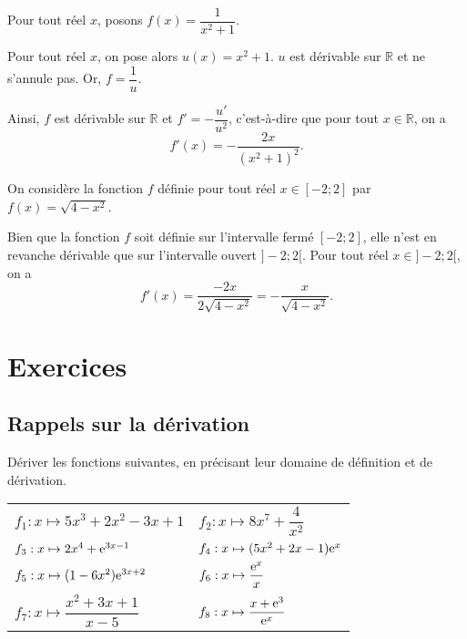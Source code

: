 \documentclass[11pt,fleqn, openany]{book} %
\begin{document}
\begin{example}Pour tout réel $x$, posons $f(x)=\dfrac{1}{x^2+1}$. 

Pour tout réel $x$, on pose alors $u(x)=x^2+1$. $u$ est dérivable sur $\mathbb{R}$ et ne s'annule pas. Or, $f=\dfrac{1}{u}$.

 Ainsi, $f$ est dérivable sur $\mathbb{R}$ et $f'=-\dfrac{u'}{u^2}$, c'est-à-dire que pour tout $x\in \mathbb{R}$, on a
\[ f'(x)=- \dfrac{2x}{(x^2+1)^2}.\]\end{example}

\begin{example}On considère la fonction $f$ définie pour tout réel $x\in[-2;2]$ par $f(x)=\sqrt{4-x^2}$.

Bien que la fonction $f$ soit définie sur l'intervalle fermé $[-2;2]$, elle n'est en revanche dérivable que sur l'intervalle ouvert $]-2;2[$. Pour tout réel $x\in]-2;2[$, on a
\[f'(x)=\dfrac{-2x}{2\sqrt{4-x^2}}=-\dfrac{x}{\sqrt{4-x^2}}.\]\end{example}

\chapter{Exercices}
\setcounter{section}{0}
\section*{Rappels sur la dérivation}

\begin{exercise}[topic=der01]Dériver les fonctions suivantes, en précisant leur domaine de définition et de dérivation.

\renewcommand{\arraystretch}{2}
\begin{tabularx}{\linewidth}{XX}
 $f_1 : x \mapsto 5x^3+2x^2-3x+1$ &
$f_2 : x \mapsto 8x^7+\dfrac{4}{x^2}$ \\
 $f_3 : x \mapsto 2x^4 + \mathrm{e}^{3x-1}$ &
 $f_4 : x \mapsto (5x^2+2x-1)\mathrm{e}^x$ \\
$f_5 : x \mapsto (1-6x^2)\mathrm{e}^{3x+2}$ &
$f_6 : x \mapsto \dfrac{\mathrm{e}^x}{x}$ \\
$f_7 : x \mapsto \dfrac{x^2+3x+1}{x-5}$ &
$f_8 : x \mapsto \dfrac{x+\mathrm{e}^3}{\mathrm{e}^x}$
\end{tabularx}\end{exercise}
\end{document}

